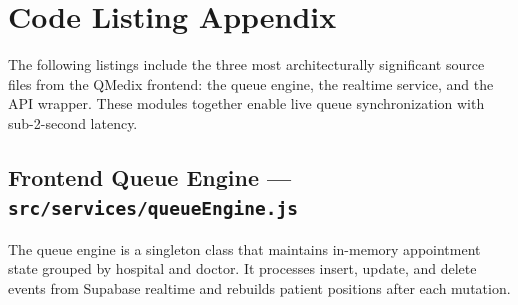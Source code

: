 \documentclass[12pt,onecolumn]{IEEEtran}
\let\oldsection\section
\renewcommand{\section}{\clearpage\oldsection}
\begin{document}
\section{Code Listing Appendix}
The following listings include the three most architecturally significant source files from the QMedix frontend: the queue engine, the realtime service, and the API wrapper. These modules together enable live queue synchronization with sub-2-second latency.

\subsection{Frontend Queue Engine — \texttt{src/services/queueEngine.js}}
The queue engine is a singleton class that maintains in-memory appointment state grouped by hospital and doctor. It processes insert, update, and delete events from Supabase realtime and rebuilds patient positions after each mutation.
\end{document}
